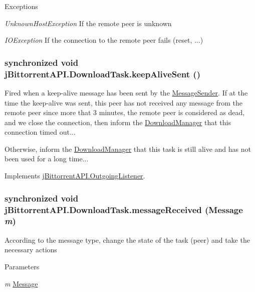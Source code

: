 \begin{DoxyExceptions}{Exceptions}
\item[{\em UnknownHostException}]If the remote peer is unknown \item[{\em IOException}]If the connection to the remote peer fails (reset, ...) \end{DoxyExceptions}
\hypertarget{classj_bittorrent_a_p_i_1_1_download_task_aaa3fad9c3cd6b12c46e76d291313060f}{
\subsubsection[{keepAliveSent}]{\setlength{\rightskip}{0pt plus 5cm}synchronized void jBittorrentAPI.DownloadTask.keepAliveSent ()}}
\label{classj_bittorrent_a_p_i_1_1_download_task_aaa3fad9c3cd6b12c46e76d291313060f}
Fired when a keep-\/alive message has been sent by the \hyperlink{classj_bittorrent_a_p_i_1_1_message_sender}{MessageSender}. If at the time the keep-\/alive was sent, this peer has not received any message from the remote peer since more that 3 minutes, the remote peer is considered as dead, and we close the connection, then inform the \hyperlink{classj_bittorrent_a_p_i_1_1_download_manager}{DownloadManager} that this connection timed out...

Otherwise, inform the \hyperlink{classj_bittorrent_a_p_i_1_1_download_manager}{DownloadManager} that this task is still alive and has not been used for a long time... 

Implements \hyperlink{interfacej_bittorrent_a_p_i_1_1_outgoing_listener_a21390243ebe1a22870106a42fa4f6d04}{jBittorrentAPI.OutgoingListener}.\hypertarget{classj_bittorrent_a_p_i_1_1_download_task_a3234c0677a09c13fdd7926e894db570d}{
\subsubsection[{messageReceived}]{\setlength{\rightskip}{0pt plus 5cm}synchronized void jBittorrentAPI.DownloadTask.messageReceived ({\bf Message} {\em m})}}
\label{classj_bittorrent_a_p_i_1_1_download_task_a3234c0677a09c13fdd7926e894db570d}
According to the message type, change the state of the task (peer) and take the necessary actions 
\begin{DoxyParams}{Parameters}
\item[{\em m}]\hyperlink{classj_bittorrent_a_p_i_1_1_message}{Message} \end{DoxyParams}


